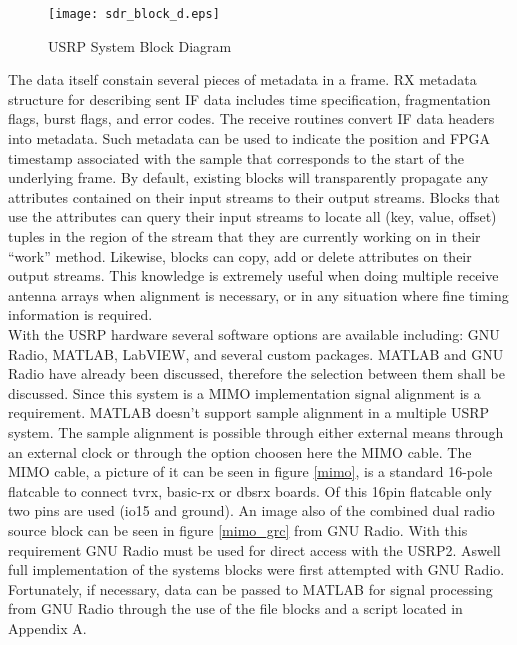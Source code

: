 \begin{figure}[!ht]
\centering
\texttt{[image: sdr\_block\_d.eps]}
\caption{USRP System Block Diagram\cite{sdr_blocks}}
\end{figure}

The data itself constain several pieces of metadata in a frame.  RX metadata structure for describing sent IF data includes time specification, fragmentation flags, burst flags, and error codes. The receive routines convert IF data headers into metadata\cite{metadata}.  Such metadata can be used to indicate the position and FPGA timestamp associated with the sample that corresponds to the start of the underlying frame. By default, existing blocks will transparently propagate any attributes contained on their input streams to their output streams. Blocks that use the attributes can query their input streams to locate all (key, value, offset) tuples in the region of the stream that they are currently working on in their “work” method. Likewise, blocks can copy, add or delete attributes on their output streams\cite{sdr_blog}.  This knowledge is extremely useful when doing multiple receive antenna arrays when alignment is necessary, or in any situation where fine timing information is required.\\

With the USRP hardware several software options are available including: GNU Radio, MATLAB, LabVIEW, and several custom packages.  MATLAB and GNU Radio have already been discussed, therefore the selection between them shall be discussed.  Since this system is a MIMO implementation signal alignment is a requirement.  MATLAB doesn't support sample alignment in a multiple USRP system.  The sample alignment is possible through either external means through an external clock or through the option choosen here the MIMO cable.  The MIMO cable, a picture of it can be seen in figure \ref{mimo}, is a standard 16-pole flatcable to connect tvrx, basic-rx or dbsrx boards.  Of this 16pin flatcable only two pins are used (io15 and ground)\cite{mimo_cable}.  An image also of the combined dual radio source block can be seen in figure \ref{mimo_grc} from GNU Radio.  With this requirement GNU Radio must be used for direct access with the USRP2.  Aswell full implementation of the systems blocks were first attempted with GNU Radio.  Fortunately, if necessary, data can be passed to MATLAB for signal processing from GNU Radio through the use of the file blocks and a script located in Appendix A.\\

